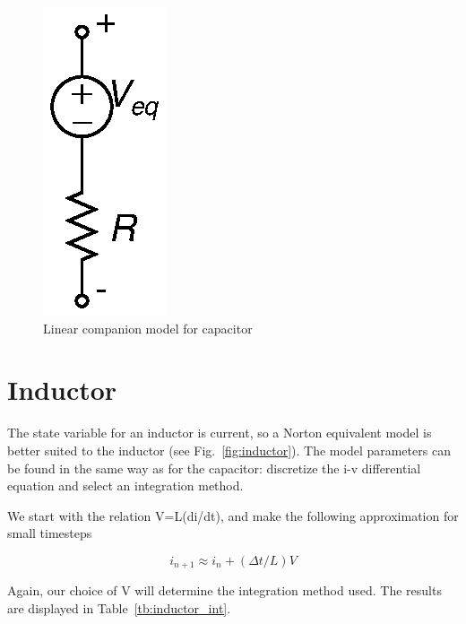 \documentclass{article}
\begin{document}
\begin{figure}[h]
\begin{center}
\includegraphics{fig/cap.eps}
\caption{Linear companion model for capacitor \label{fig:cap}}
\end{center}
\end{figure}

\pagebreak

\section{Inductor}

The state variable for an inductor is current, so a Norton equivalent model is better suited to the inductor (see Fig.~\ref{fig:inductor}).  The model parameters can be found in the same way as for the capacitor: discretize the i-v differential equation and select an integration method.

We start with the relation V=L(di/dt), and make the following approximation for small timesteps

\begin{equation}
i_{n+1} \approx i_n + (\Delta t/L)V
\end{equation}

Again, our choice of V will determine the integration method used.  The results are displayed in Table~\ref{tb:inductor_int}.
\end{document}
